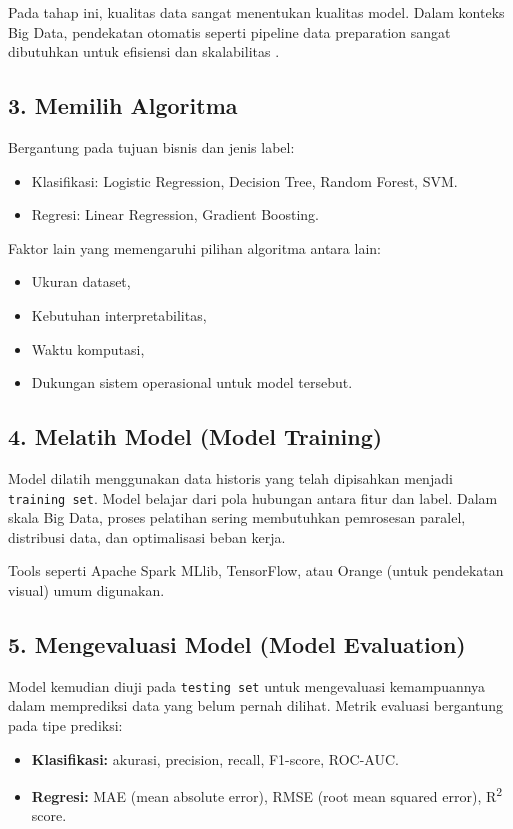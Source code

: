Pada tahap ini, kualitas data sangat menentukan kualitas model. Dalam konteks Big Data, pendekatan otomatis seperti pipeline data preparation sangat dibutuhkan untuk efisiensi dan skalabilitas \cite{rahm2000dataquality}.

\subsection*{3. Memilih Algoritma}

Bergantung pada tujuan bisnis dan jenis label:
\begin{itemize}
	\item Klasifikasi: Logistic Regression, Decision Tree, Random Forest, SVM.
	\item Regresi: Linear Regression, Gradient Boosting.
\end{itemize}

Faktor lain yang memengaruhi pilihan algoritma antara lain:
\begin{itemize}
	\item Ukuran dataset,
	\item Kebutuhan interpretabilitas,
	\item Waktu komputasi,
	\item Dukungan sistem operasional untuk model tersebut.
\end{itemize}

\subsection*{4. Melatih Model (Model Training)}

Model dilatih menggunakan data historis yang telah dipisahkan menjadi \texttt{training set}. Model belajar dari pola hubungan antara fitur dan label.  
Dalam skala Big Data, proses pelatihan sering membutuhkan pemrosesan paralel, distribusi data, dan optimalisasi beban kerja.

Tools seperti Apache Spark MLlib, TensorFlow, atau Orange (untuk pendekatan visual) umum digunakan.

\subsection*{5. Mengevaluasi Model (Model Evaluation)}

Model kemudian diuji pada \texttt{testing set} untuk mengevaluasi kemampuannya dalam memprediksi data yang belum pernah dilihat.  
Metrik evaluasi bergantung pada tipe prediksi:
\begin{itemize}
	\item \textbf{Klasifikasi:} akurasi, precision, recall, F1-score, ROC-AUC.
	\item \textbf{Regresi:} MAE (mean absolute error), RMSE (root mean squared error), R\textsuperscript{2} score.
\end{itemize}

